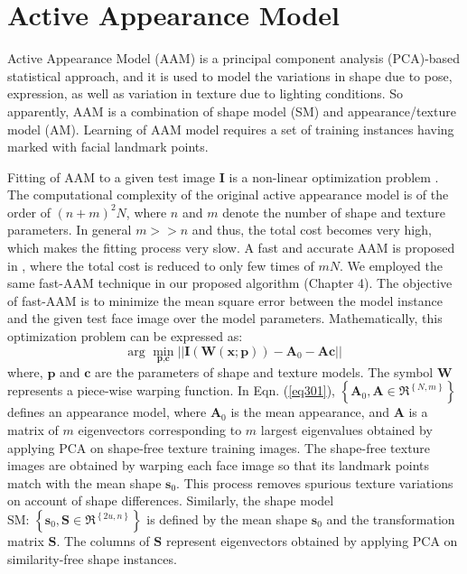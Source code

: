 
\section{Active Appearance Model}\label{AppendixAAM}
\noindent Active Appearance Model (AAM) \cite{cootes2001active} is a principal component analysis (PCA)-based statistical approach, and it is used to model the variations in shape due to pose, expression, as well as variation in texture due to lighting conditions. So apparently, AAM is a combination of shape model (SM) and appearance/texture model (AM). Learning of AAM model requires a set of training instances having marked with facial landmark points.
\par Fitting of AAM to a given test image {\bf I} is a non-linear optimization problem \cite{baker2004lucas}. The computational complexity of the original active appearance model is of the order of ${\left( {n + m} \right)^2}N$, where $n$ and $m$ denote the number of shape and texture parameters. In general $m >> n$ and thus, the total cost becomes very high, which makes the fitting process very slow. A fast and accurate AAM is proposed in \cite{6751183}, where the total cost is reduced to only few times of $mN$. We employed the same fast-AAM technique in our proposed algorithm (Chapter 4). The objective of fast-AAM is to minimize the mean square error between the model instance and the given test face image over the model parameters. Mathematically, this optimization problem can be expressed as: %
\begin{equation}\label{eq301}
{\text{arg }}\mathop {\min }\limits_{{\mathbf{p}}{\text{,}}{\mathbf{c}}} ||{\mathbf{I}}\left( {{\mathbf{W}}\left( {{\mathbf{x}};{\mathbf{p}}} \right)} \right) - {{\mathbf{A}}_0} - {\mathbf{Ac}}||
\end{equation}
where, $\mathbf{p}$ and $\mathbf{c}$ are the parameters of shape and texture models. The symbol $\mathbf{W}$ represents a piece-wise warping function. In Eqn. (\ref{eq301}), $\left\{ {{{\mathbf{A}}_0},{\mathbf{A}} \in {\Re ^{\left\{ {N,m} \right\}}}} \right\}$ defines an appearance model, where ${\mathbf{A}}_0$ is the mean appearance, and $\mathbf{A}$ is a matrix of $m$ eigenvectors corresponding to $m$ largest eigenvalues obtained by applying PCA on shape-free texture training images. The shape-free texture images are obtained by warping each face image so that its landmark points match with the mean shape ${\mathbf{s}}_0$. This process removes spurious texture variations on account of shape differences. Similarly, the shape model ${\text{SM: }}\left\{ {{{\mathbf{s}}_0},{\mathbf{S}} \in {\Re ^{\left\{ {2u,n} \right\}}}} \right\}$ is defined by the mean shape ${\mathbf{s}}_0$ and the transformation matrix $\mathbf{S}$. The columns of $\mathbf{S}$ represent eigenvectors obtained by applying PCA on similarity-free shape instances.
